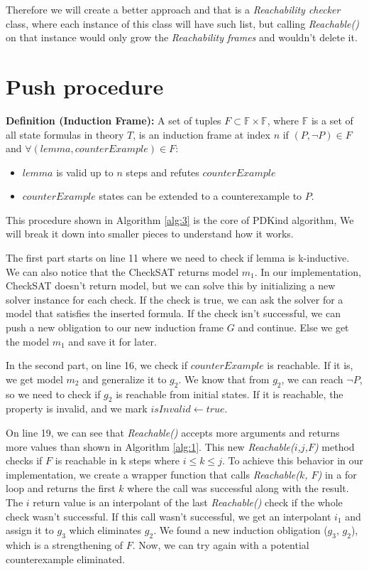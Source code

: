 Therefore we will create a better approach and that is a \textit{Reachability checker} class, where each instance of this class will have such list, but calling \textit{Reachable()} on that instance would only grow the \textit{Reachability frames} and wouldn't delete it.
\newpage
\section{Push procedure}

\noindent \textbf{Definition (Induction Frame)\cite{7886665}:} A set of tuples $F \subset \mathbb{F} \times \mathbb{F}$, where $\mathbb{F}$ is a set of all state formulas in theory $T$, is an induction frame at index $n$ if $(P, \neg P) \in F$ and $\forall (lemma, counterExample) \in F$:
\begin{itemize}
    \item $lemma$ is valid up to $n$ steps and refutes $counterExample$
    \item $counterExample$ states can be extended to a counterexample to $P$.
\end{itemize}

\noindent This procedure shown in Algorithm \ref{alg:3} is the core of PDKind algorithm, We will break it down into smaller pieces to understand how it works.

The first part starts on line 11 where we need to check if lemma is k-inductive. We can also notice that the CheckSAT returns model $m_1$. In our implementation, CheckSAT doesn't return model, but we can solve this by initializing a new solver instance for each check. If the check is true, we can ask the solver for a model that satisfies the inserted formula.
If the check isn't successful, we can push a new obligation to our new induction frame $G$ and continue. Else we get the model $m_1$ and save it for later.

In the second part, on line 16, we check if $counterExample$ is reachable. If it is, we get model $m_2$ and generalize it to $g_2$. We know that from $g_2$, we can reach $\neg P$, so we need to check if $g_2$ is reachable from initial states. If it is reachable, the property is invalid, and we mark $isInvalid \gets true$.

On line 19, we can see that \textit{Reachable()} accepts more arguments and returns more values than shown in Algorithm \ref{alg:1}. This new \textit{Reachable($i$,$j$,$F$)} method checks if $F$ is reachable in k steps where $i\leq k \leq j$. To achieve this behavior in our implementation, we create a wrapper function that calls \textit{Reachable($k$, $F$)} in a for loop and returns the first $k$ where the call was successful along with the result. The $i$ return value is an interpolant of the last \textit{Reachable()} check if the whole check wasn't successful.
If this call wasn't successful, we get an interpolant $i_1$ and assign it to $g_3$ which eliminates $g_2$. We found a new induction obligation ($g_3$, $g_2$), which is a strengthening of $F$. Now, we can try again with a potential counterexample eliminated.

